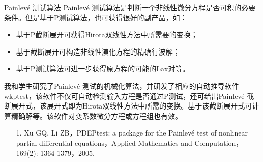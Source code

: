 \documentclass{beamer}
\begin{document}
\begin{frame}{Painlev\'e 测试算法}
Painlev\'e 测试算法是判断一个非线性微分方程是否可积的必要条件。但是基于P测试算法，也可获得很好的副产品，如：
\begin{itemize}
  \item 基于P截断展开可获得Hirota双线性方法中所需要的变换；
  \item 基于截断展开可构造非线性演化方程的精确行波解； 
  \item 基于P测试算法可进一步获得原方程的可能的Lax对等。
\end{itemize} 
我和学生研究了Painlev\'e 测试的机械化算法，并研发了相应的自动推导软件wkptest，该软件不仅可自动检测输入方程是否通过P测试，还可给出Painlev\'e 截断展开式，该展开式即为Hirota双线性方法中所需的变换。基于该截断展开式可计算精确解等。该软件对变系数微分方程或方程组也有效。
\begin{itemize}
  \item[1.] Xu GQ, Li ZB，PDEPtest: a package for the Painlevé test of nonlinear partial differential equations，Applied Mathematics and Computation，169(2): 1364-1379，2005.
\end{itemize}       
\end{frame}
\end{document}
